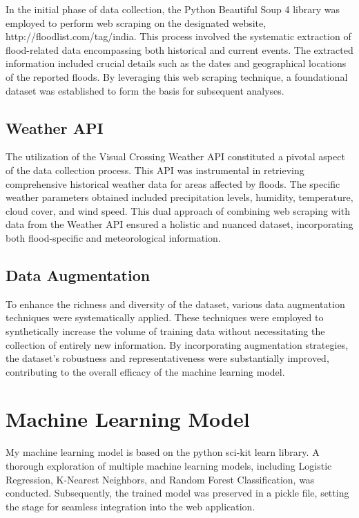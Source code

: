 \documentclass[a4paper,12pt]{report}
\begin{document}
In the initial phase of data collection, the Python Beautiful Soup 4 library was employed to perform web scraping on the designated website, http://floodlist.com/tag/india. This process involved the systematic extraction of flood-related data encompassing both historical and current events. The extracted information included crucial details such as the dates and geographical locations of the reported floods. By leveraging this web scraping technique, a foundational dataset was established to form the basis for subsequent analyses.

\subsection{Weather API}

The utilization of the Visual Crossing Weather API constituted a pivotal aspect of the data collection process. This API was instrumental in retrieving comprehensive historical weather data for areas affected by floods. The specific weather parameters obtained included precipitation levels, humidity, temperature, cloud cover, and wind speed. This dual approach of combining web scraping with data from the Weather API ensured a holistic and nuanced dataset, incorporating both flood-specific and meteorological information.

\subsection{Data Augmentation}

To enhance the richness and diversity of the dataset, various data augmentation techniques were systematically applied. These techniques were employed to synthetically increase the volume of training data without necessitating the collection of entirely new information. By incorporating augmentation strategies, the dataset's robustness and representativeness were substantially improved, contributing to the overall efficacy of the machine learning model.

\section{Machine Learning Model}

My machine learning model is based on the python sci-kit learn library. A thorough exploration of multiple machine learning models, including Logistic Regression, K-Nearest Neighbors, and Random Forest Classification, was conducted. Subsequently, the trained model was preserved in a pickle file, setting the stage for seamless integration into the web application.
\end{document}
